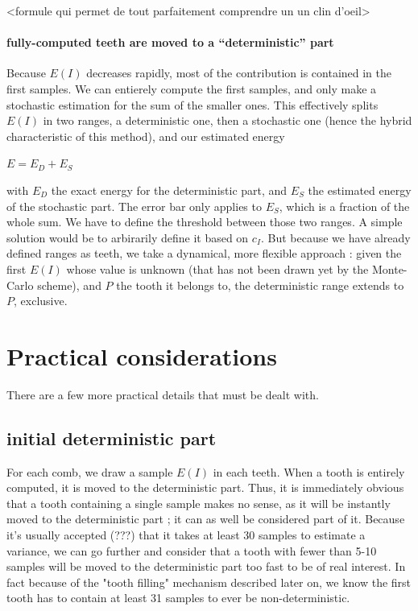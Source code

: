 \documentclass[./thesis.tex]{subfiles}
\begin{document}
<formule qui permet de tout parfaitement comprendre un un clin d'oeil>


\paragraph{fully-computed teeth are moved to a ``deterministic'' part}


Because $E(I)$ decreases rapidly, most of the contribution is contained in the first samples. We can entierely compute the first samples, and only make a stochastic estimation for the sum of the smaller ones. This effectively splits $E(I)$ in two ranges, a deterministic one, then a stochastic one (hence the hybrid characteristic of this method), and our estimated energy

$E = E_D + E_S$

with $E_D$ the exact energy for the deterministic part, and $E_S$ the estimated energy of the stochastic part. The error bar only applies to $E_S$, which is a fraction of the whole sum.
We have to define the threshold between those two ranges. A simple solution would be to arbirarily define it based on $c_I$.
But because we have already defined ranges as teeth, we take a dynamical, more flexible approach : given the first $E(I)$ whose value is unknown (that has not been drawn yet by the Monte-Carlo scheme), and $P$ the tooth it belongs to, the deterministic range extends to $P$, exclusive.

\section{Practical considerations}

There are a few more practical details that must be dealt with.

\subsection*{initial deterministic part}

For each comb, we draw a sample $E(I)$ in each teeth. When a tooth is entirely computed, it is moved to the deterministic part. Thus, it is immediately obvious that a tooth containing a single sample makes no sense, as it will be instantly moved to the deterministic part ; it can as well be considered part of it. Because it's usually accepted (???) that it takes at least 30 samples to estimate a variance, we can go further and consider that a tooth with fewer than 5-10 samples will be moved to the deterministic part too fast to be of real interest. In fact because of the "tooth filling" mechanism described later on, we know the first tooth has to contain at least 31 samples to ever be non-deterministic.
\end{document}
